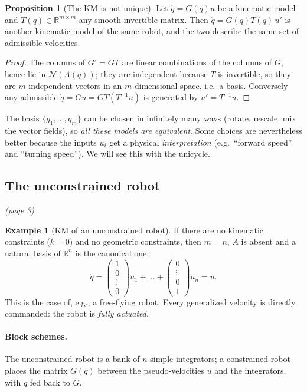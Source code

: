 \documentclass[11pt,a4paper]{article}
\newcommand{\R}{\mathbb{R}}
\newcommand{\N}{\mathcal{N}}
\newcommand{\dq}{\dot q}
\theoremstyle{definition}
\newtheorem{proposition}[theorem]{Proposition}
\newtheorem{example}[theorem]{Example}
\begin{document}
\begin{proposition}[The KM is not unique]\label{prop:nonuniq}
Let $\dq=G(q)u$ be a kinematic model and $T(q)\in\R^{m\times m}$ any smooth invertible matrix. Then $\dq=G(q)T(q)\,u'$ is another kinematic model of the same robot, and the two describe the same set of admissible velocities.
\end{proposition}
\begin{proof}
The columns of $G'=GT$ are linear combinations of the columns of $G$, hence lie in $\N(A(q))$; they are independent because $T$ is invertible, so they are $m$ independent vectors in an $m$-dimensional space, i.e.\ a basis. Conversely any admissible $\dq=Gu=GT(T^{-1}u)$ is generated by $u'=T^{-1}u$.
\end{proof}

\begin{intuition}
The basis $\{g_1,\dots,g_m\}$ can be chosen in infinitely many ways (rotate, rescale, mix the vector fields), so \emph{all these models are equivalent}. Some choices are nevertheless better because the inputs $u_i$ get a physical \emph{interpretation} (e.g.\ ``forward speed'' and ``turning speed''). We will see this with the unicycle.
\end{intuition}

\subsection{The unconstrained robot}\emph{(page 3)}

\begin{example}[KM of an unconstrained robot]
If there are no kinematic constraints ($k=0$) and no geometric constraints, then $m=n$, $A$ is absent and a natural basis of $\R^n$ is the canonical one:
\[
\dq=\begin{pmatrix}1\\0\\ \vdots\\0\end{pmatrix}u_1+\dots+\begin{pmatrix}0\\ \vdots\\0\\1\end{pmatrix}u_n = u .
\]
This is the case of, e.g., a free-flying robot. Every generalized velocity is directly commanded: the robot is \emph{fully actuated}.
\end{example}

\paragraph{Block schemes.} The unconstrained robot is a bank of $n$ simple integrators; a constrained robot places the matrix $G(q)$ between the pseudo-velocities $u$ and the integrators, with $q$ fed back to $G$.
\end{document}
